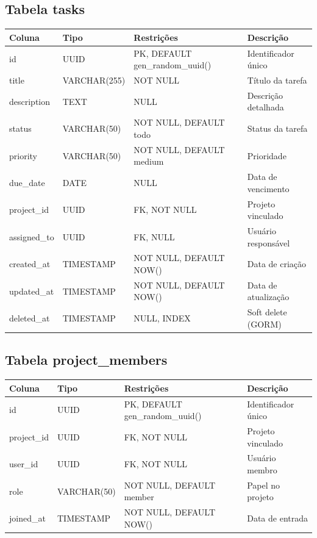 \documentclass[a4paper,12pt,oneside]{article}
\begin{document}
\subsection{Tabela tasks}

\begin{table}[H]
\centering
\small
\begin{tabularx}{\textwidth}{l l l X}
\toprule
\textbf{Coluna} & \textbf{Tipo} & \textbf{Restrições} & \textbf{Descrição} \\
\midrule
id & UUID & PK, DEFAULT gen\_random\_uuid() & Identificador único \\
title & VARCHAR(255) & NOT NULL & Título da tarefa \\
description & TEXT & NULL & Descrição detalhada \\
status & VARCHAR(50) & NOT NULL, DEFAULT todo & Status da tarefa \\
priority & VARCHAR(50) & NOT NULL, DEFAULT medium & Prioridade \\
due\_date & DATE & NULL & Data de vencimento \\
project\_id & UUID & FK, NOT NULL & Projeto vinculado \\
assigned\_to & UUID & FK, NULL & Usuário responsável \\
created\_at & TIMESTAMP & NOT NULL, DEFAULT NOW() & Data de criação \\
updated\_at & TIMESTAMP & NOT NULL, DEFAULT NOW() & Data de atualização \\
deleted\_at & TIMESTAMP & NULL, INDEX & Soft delete (GORM) \\
\bottomrule
\end{tabularx}
\end{table}

\subsection{Tabela project\_members}

\begin{table}[H]
\centering
\small
\begin{tabularx}{\textwidth}{l l l X}
\toprule
\textbf{Coluna} & \textbf{Tipo} & \textbf{Restrições} & \textbf{Descrição} \\
\midrule
id & UUID & PK, DEFAULT gen\_random\_uuid() & Identificador único \\
project\_id & UUID & FK, NOT NULL & Projeto vinculado \\
user\_id & UUID & FK, NOT NULL & Usuário membro \\
role & VARCHAR(50) & NOT NULL, DEFAULT member & Papel no projeto \\
joined\_at & TIMESTAMP & NOT NULL, DEFAULT NOW() & Data de entrada \\
\bottomrule
\end{tabularx}
\end{table}
\end{document}

